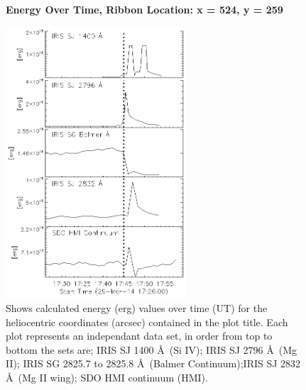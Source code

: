 \begin{figure}[H]
  \begin{center}
  \textbf{Energy Over Time, Ribbon Location: x = 524, y = 259 }\par\medskip
  \includegraphics[width=0.6\textwidth]{29-Mar-14-Ribbon-xyPosition-524-259-Frame-2-Energy-Ladder}
  \end{center}
  \caption{Shows calculated energy (erg) values over time (UT) for the heliocentric coordinates (arcsec) contained in the plot title. Each plot represents an independant data set, in order from top to bottom the sets are; IRIS SJ 1400 \AA\ (Si IV); IRIS SJ 2796 \AA\ (Mg II); IRIS SG  2825.7 to 2825.8 \AA\ (Balmer Continuum);IRIS SJ 2832 \AA\ (Mg II wing); SDO HMI continuum (HMI).}\label{erb15}
\end{figure}

